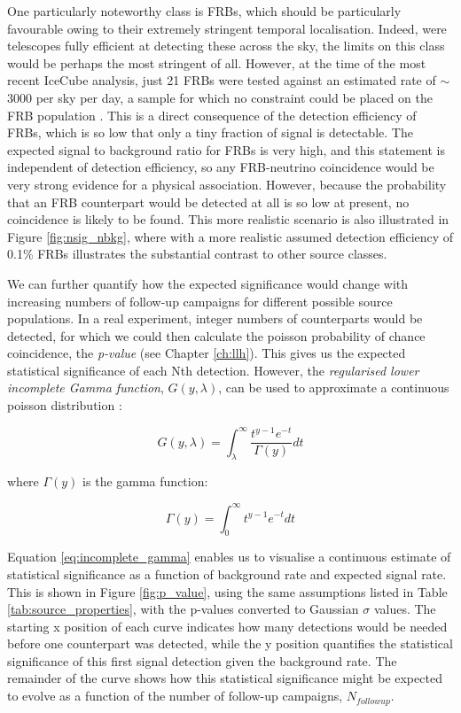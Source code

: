 One particularly noteworthy class is FRBs, which should be particularly favourable owing to their extremely stringent temporal localisation. Indeed, were telescopes fully efficient at detecting these across the sky, the limits on this class would be perhaps the most stringent of all. However, at the time of the most recent IceCube analysis, just 21 FRBs were tested against an estimated rate of $\sim$3000 per sky per day, a sample for which no constraint could be placed on the FRB population . This is a direct consequence of the detection efficiency of FRBs, which is so low that only a tiny fraction of signal is detectable. The expected signal to background ratio for FRBs is very high, and this statement is independent of detection efficiency, so any FRB-neutrino coincidence would be very strong evidence for a physical association. However, because the probability that an FRB counterpart would be detected at all is so low at present, no coincidence is likely to be found. This more realistic scenario is also illustrated in Figure \ref{fig:nsig_nbkg}, where with a more realistic assumed detection efficiency of 0.1\% FRBs illustrates the substantial contrast to other source classes.

We can further quantify how the expected significance would change with increasing numbers of follow-up campaigns for different possible source populations. In a real experiment, integer numbers of counterparts would be detected, for which we could then calculate the poisson probability of chance coincidence, the \emph{p-value} (see Chapter \ref{ch:llh}). This gives us the expected statistical significance of each Nth detection. However, the \emph{regularised lower incomplete Gamma function}, $G (y, \lambda)$, can be used to approximate a continuous poisson distribution :

\begin{equation}
G (y, \lambda) = \int_{\lambda}^{\infty} \frac{t^{y-1} e^{-t}}{\Gamma (y)} dt
\label{eq:incomplete_gamma}
\end{equation}

where ${\Gamma (y)}$ is the gamma function:

\begin{equation}
\Gamma (y) = \int_{0}^{\infty} t^{y-1} e^{-t} dt
\end{equation}

Equation \ref{eq:incomplete_gamma} enables us to visualise a continuous estimate of statistical significance as a function of background rate and expected signal rate. This is shown in Figure \ref{fig:p_value}, using the same assumptions listed in Table \ref{tab:source_properties}, with the p-values converted to Gaussian $\sigma$ values. The starting x position of each curve indicates how many detections would be needed before one counterpart was detected, while the y position quantifies the statistical significance of this first signal detection given the background rate. The remainder of the curve shows how this statistical significance might be expected to evolve as a function of the number of follow-up campaigns, $N_{followup}$.

